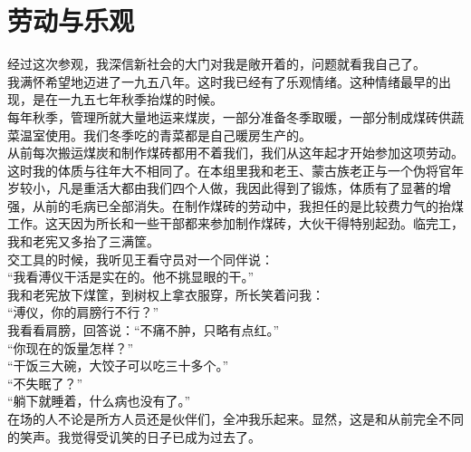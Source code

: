 \fancyhead[RO]{} %
\fancyhead[LE]{} %
\chapter*{劳动与乐观}
\thispagestyle{empty}
经过这次参观，我深信新社会的大门对我是敞开着的，问题就看我自己了。\\

我满怀希望地迈进了一九五八年。这时我已经有了乐观情绪。这种情绪最早的出现，是在一九五七年秋季抬煤的时候。\\

每年秋季，管理所就大量地运来煤炭，一部分准备冬季取暖，一部分制成煤砖供蔬菜温室使用。我们冬季吃的青菜都是自己暖房生产的。\\

从前每次搬运煤炭和制作煤砖都用不着我们，我们从这年起才开始参加这项劳动。这时我的体质与往年大不相同了。在本组里我和老王、蒙古族老正与一个伪将官年岁较小，凡是重活大都由我们四个人做，我因此得到了锻炼，体质有了显著的增强，从前的毛病已全部消失。在制作煤砖的劳动中，我担任的是比较费力气的抬煤工作。这天因为所长和一些干部都来参加制作煤砖，大伙干得特别起劲。临完工，我和老宪又多抬了三满筐。\\

交工具的时候，我听见王看守员对一个同伴说：\\

“我看溥仪干活是实在的。他不挑显眼的干。”\\

我和老宪放下煤筐，到树权上拿衣服穿，所长笑着问我：\\

“溥仪，你的肩膀行不行？”\\

我看看肩膀，回答说：“不痛不肿，只略有点红。”\\

“你现在的饭量怎样？”\\

“干饭三大碗，大饺子可以吃三十多个。”\\

“不失眠了？”\\

“躺下就睡着，什么病也没有了。”\\

在场的人不论是所方人员还是伙伴们，全冲我乐起来。显然，这是和从前完全不同的笑声。我觉得受讥笑的日子已成为过去了。\\

